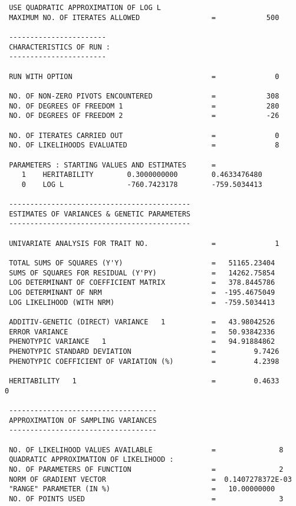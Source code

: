 \documentclass[titlepage]{article}  %
\begin{document}
\begin{verbatim}
 USE QUADRATIC APPROXIMATION OF LOG L
 MAXIMUM NO. OF ITERATES ALLOWED                 =            500
  
 -----------------------
 CHARACTERISTICS OF RUN :
 -----------------------
  
 RUN WITH OPTION                                 =              0
  
 NO. OF NON-ZERO PIVOTS ENCOUNTERED              =            308
 NO. OF DEGREES OF FREEDOM 1                     =            280
 NO. OF DEGREES OF FREEDOM 2                     =            -26
  
 NO. OF ITERATES CARRIED OUT                     =              0
 NO. OF LIKELIHOODS EVALUATED                    =              8
  
 PARAMETERS : STARTING VALUES AND ESTIMATES      =
    1    HERITABILITY        0.3000000000        0.4633476480    
    0    LOG L               -760.7423178        -759.5034413    
  
 -------------------------------------------
 ESTIMATES OF VARIANCES & GENETIC PARAMETERS
 -------------------------------------------
  
 UNIVARIATE ANALYSIS FOR TRAIT NO.               =              1
  
 TOTAL SUMS OF SQUARES (Y'Y)                     =   51165.23404    
 SUMS OF SQUARES FOR RESIDUAL (Y'PY)             =   14262.75854    
 LOG DETERMINANT OF COEFFICIENT MATRIX           =   378.8445786    
 LOG DETERMINANT OF NRM                          =  -195.4675049    
 LOG LIKELIHOOD (WITH NRM)                       =  -759.5034413    
  
 ADDITIV-GENETIC (DIRECT) VARIANCE   1           =   43.98042526    
 ERROR VARIANCE                                  =   50.93842336    
 PHENOTYPIC VARIANCE   1                         =   94.91884862    
 PHENOTYPIC STANDARD DEVIATION                   =         9.7426
 PHENOTYPIC COEFFICIENT OF VARIATION (%)         =         4.2398
  
 HERITABILITY   1                                =         0.4633           0
  
 -----------------------------------
 APPROXIMATION OF SAMPLING VARIANCES
 -----------------------------------
  
 NO. OF LIKELIHOOD VALUES AVAILABLE              =               8
 QUADRATIC APPROXIMATION OF LIKELIHOOD :
 NO. OF PARAMETERS OF FUNCTION                   =               2
 NORM OF GRADIENT VECTOR                         =  0.1407278372E-03
 "RANGE" PARAMETER (IN %)                        =   10.00000000    
 NO. OF POINTS USED                              =               3
  

\end{verbatim}
\end{document}

